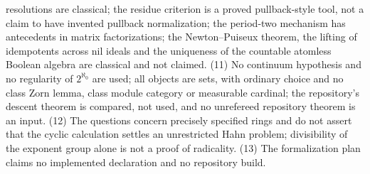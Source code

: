 \documentclass[11pt,letterpaper]{article}
\numberwithin{equation}{section}
\theoremstyle{definition}
\theoremstyle{remark}
\theoremstyle{plain}
\begin{document}
resolutions are classical; the residue criterion is a proved pullback-style tool, not a claim to have invented pullback normalization; the
period-two mechanism has antecedents in matrix factorizations; the Newton--Puiseux theorem, the lifting of idempotents across nil ideals and the
uniqueness of the countable atomless Boolean algebra are classical and not claimed. (11) No continuum hypothesis and no regularity of $2^{\aleph_0}$
are used; all objects are sets, with ordinary choice and no class Zorn lemma, class module category or measurable cardinal; the repository's
descent theorem is compared, not used, and no unrefereed repository theorem is an input. (12) The questions concern precisely specified rings and do
not assert that the cyclic calculation settles an unrestricted Hahn problem; divisibility of the exponent group alone is not a proof of radicality.
(13) The formalization plan claims no implemented declaration and no repository build.
\end{document}
